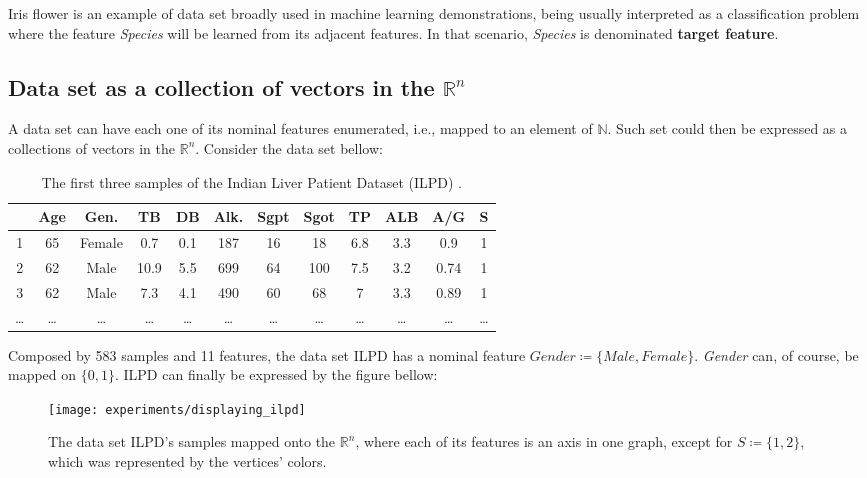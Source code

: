 Iris flower is an example of data set broadly used in machine learning demonstrations, being usually interpreted as a classification problem where the feature {\em Species} will be learned from its adjacent features. In that scenario, {\em Species} is denominated \textbf{target feature}.

\subsection{Data set as a collection of vectors in the $\mathbb{R}^n$}

A data set can have each one of its nominal features enumerated, i.e., mapped to an element of $\mathbb{N}$. Such set could then be expressed as a collections of vectors in the $\mathbb{R}^n$. Consider the data set bellow:

\begin{table}[H]
	\begin{tabular}{ c | *{11}{|c}| }
		& \textbf{Age}
		& \textbf{Gen.}
		& \textbf{TB}
		& \textbf{DB}
		& \textbf{Alk.}
		& \textbf{Sgpt}
		& \textbf{Sgot}
		& \textbf{TP}
		& \textbf{ALB}
		& \textbf{A/G}
		& \textbf{S} \\
		 & 65 & Female & 0.7 & 0.1 & 187 & 16 & 18 & 6.8 & 3.3 & 0.9 & 1 \\
		2 & 62 & Male & 10.9 & 5.5 & 699 & 64 & 100 & 7.5 & 3.2 & 0.74 & 1 \\
		3 & 62 & Male & 7.3 & 4.1 & 490 & 60 & 68 & 7 & 3.3 & 0.89 & 1\\
		… & … & … & … & … & … & … & … & … & … & … & … \\
	\end{tabular}

	\caption{The first three samples of the Indian Liver Patient Dataset (ILPD) \cite{lichman2013}.}
\end{table}

Composed by 583 samples and 11 features, the data set ILPD has a nominal feature $Gender \coloneqq \{Male, Female\}$. {\em Gender} can, of course, be mapped on $\{0, 1\}$. ILPD can finally be expressed by the figure bellow:

\begin{figure}[H]
	\centering
	\captionsetup{justification=centering}

	\texttt{[image: experiments/displaying\_ilpd]}
	\caption{The data set ILPD's samples mapped onto the $\mathbb{R}^n$, where each of its features is an axis in one graph, except for $S \coloneqq \{1, 2\}$, which was represented by the vertices' colors.}
	\label{fig:disp_ilpd}
\end{figure}

